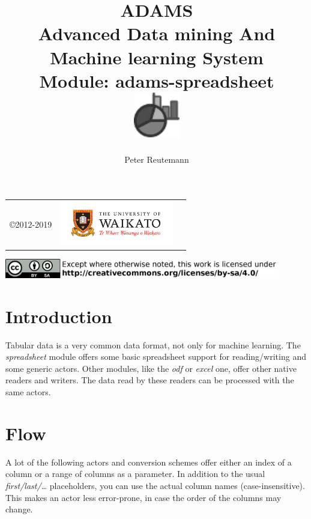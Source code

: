 \documentclass[a4paper]{book}
\title{
  \textbf{ADAMS} \\
  {\Large \textbf{A}dvanced \textbf{D}ata mining \textbf{A}nd \textbf{M}achine
  learning \textbf{S}ystem} \\
  {\Large Module: adams-spreadsheet} \\
  \vspace{1cm}
  \includegraphics[width=2cm]{images/spreadsheet-module.png} \\
}
\author{
  Peter Reutemann
}
\begin{document}
\begin{titlepage}
\maketitle

\thispagestyle{empty}
\center
\begin{table}[b]
	\begin{tabular}{c l l}
		\parbox[c][2cm]{2cm}{\copyright 2012-2019} &
		\parbox[c][2cm]{5cm}{\includegraphics[width=5cm]{images/coat_of_arms.pdf}} \\
	\end{tabular}
	\includegraphics[width=12cm]{images/cc.png} \\
\end{table}

\end{titlepage}

\tableofcontents
\listoffigures


\chapter{Introduction}
Tabular data is a very common data format, not only for machine learning.
The \textit{spreadsheet} module offers some basic spreadsheet support for
reading/writing and some generic actors. Other modules, like the \textit{odf}
or \textit{excel} one, offer other native readers and writers. The data
read by these readers can be processed with the same actors.


\chapter{Flow}
A lot of the following actors and conversion schemes offer either an index of
a column or a range of columns as a parameter. In addition to the usual
\textit{first/last/\ldots} placeholders, you can use the actual column names
(case-insensitive). This makes an actor less error-prone, in case the order 
of the columns may change.
\end{document}
